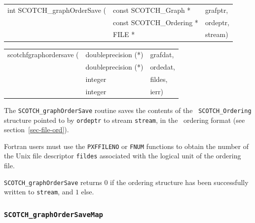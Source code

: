 \begin{itemize}
\progsyn

{\tt\begin{tabular}{l@{}ll}
int SCOTCH\_graphOrderSave ( & const SCOTCH\_Graph *    & grafptr, \\
                             & const SCOTCH\_Ordering * & ordeptr, \\
                             & FILE *                   & stream)
\end{tabular}}

{\tt\begin{tabular}{l@{}ll}
scotchfgraphordersave ( & doubleprecision (*) & grafdat, \\
                        & doubleprecision (*) & ordedat, \\
                        & integer             & fildes, \\
                        & integer             & ierr)
\end{tabular}}

\progdes

The {\tt SCOTCH\_graphOrderSave} routine saves the contents of the {\tt
SCOTCH\_\lbt Ordering} structure pointed to by {\tt ordeptr} to stream
{\tt stream}, in the \scotch\ ordering format (see
section~\ref{sec-file-ord}).

Fortran users must use the {\tt PXFFILENO} or {\tt FNUM} functions to
obtain the number of the Unix file descriptor {\tt fildes} associated
with the logical unit of the ordering file.

\progret

{\tt SCOTCH\_graphOrderSave} returns $0$ if the ordering structure
has been successfully written to {\tt stream}, and $1$ else.
\end{itemize}

\subsubsection{{\tt SCOTCH\_graphOrderSaveMap}}

